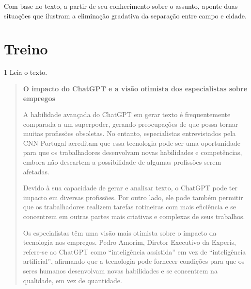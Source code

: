 Com base no texto, a partir de seu conhecimento sobre o assunto, aponte
duas situações que ilustram a eliminação gradativa da separação entre
campo e cidade.


\section{Treino}

\num{1} Leia o texto.

\begin{quote}
\textbf{O impacto do ChatGPT e a visão otimista dos especialistas sobre empregos}

A habilidade avançada do ChatGPT em gerar texto é frequentemente
comparada a um superpoder, gerando preocupações de que possa tornar
muitas profissões obsoletas. No entanto, especialistas entrevistados
pela CNN Portugal acreditam que essa tecnologia pode ser uma
oportunidade para que os trabalhadores desenvolvam novas habilidades e
competências, embora não descartem a possibilidade de algumas profissões
serem afetadas.

Devido à sua capacidade de gerar e analisar texto, o ChatGPT pode ter
impacto em diversas profissões. Por outro lado, ele pode também permitir
que os trabalhadores realizem tarefas rotineiras com mais eficiência e
se concentrem em outras partes mais criativas e complexas de seus
trabalhos.

Os especialistas têm uma visão mais otimista sobre o impacto da
tecnologia nos empregos. Pedro Amorim, Diretor Executivo da Experis,
refere-se ao ChatGPT como ``inteligência assistida'' em vez de
``inteligência artificial'', afirmando que a tecnologia pode fornecer
condições para que os seres humanos desenvolvam novas habilidades e se
concentrem na qualidade, em vez de quantidade.

\end{quote}

